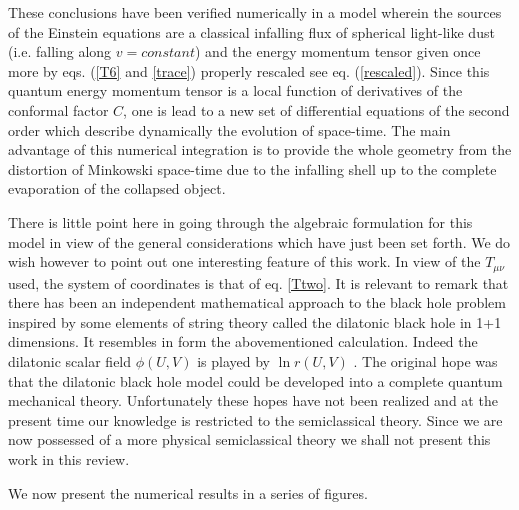 \documentclass[12pt,oneside]{report}
\begin{document}
These conclusions  have been verified numerically in a  model \cite{PP}
wherein
the sources of the Einstein equations are a classical
infalling flux of spherical light-like dust (i.e. falling along $v=constant$)
and the energy momentum tensor given once more by eqs. (\ref{T6} and
\ref{trace}) properly rescaled see eq. (\ref{rescaled}).
Since this quantum energy momentum tensor is a local function
of derivatives of
the conformal factor $C$,
one is lead to a new set of differential equations
of the second order which describe dynamically the evolution of space-time.
The main advantage of this 
numerical integration is to provide the whole geometry from the distortion of 
Minkowski space-time due to the infalling shell up to the complete evaporation
of the collapsed object.

There is little point here in going through the algebraic formulation for
this model in view of the general considerations which have just been set
forth. We do wish however to point out one interesting feature of this work.
In view of the $T_{\mu\nu}$ used, the system of coordinates is that of eq.
\ref{Ttwo}. It is relevant to remark that there has been an 
independent mathematical approach to the black hole problem inspired by some
elements of string theory called the dilatonic black hole in 1+1 dimensions.
It resembles in form the abovementioned calculation. Indeed the dilatonic
scalar field $\phi(U,V)$ is played by $\ln r(U,V)$ 
\cite{CGHS}\cite{RST}\cite{SVV}\cite{PS}. 
The original hope was that the dilatonic black
hole model could be developed into a complete quantum mechanical theory.
Unfortunately these hopes have not been realized and at the present time our
knowledge is restricted to the semiclassical theory. Since we are now
possessed of a more physical semiclassical theory we shall not present this
work in this review.

We now present the numerical results in a series of figures.
\end{document}
